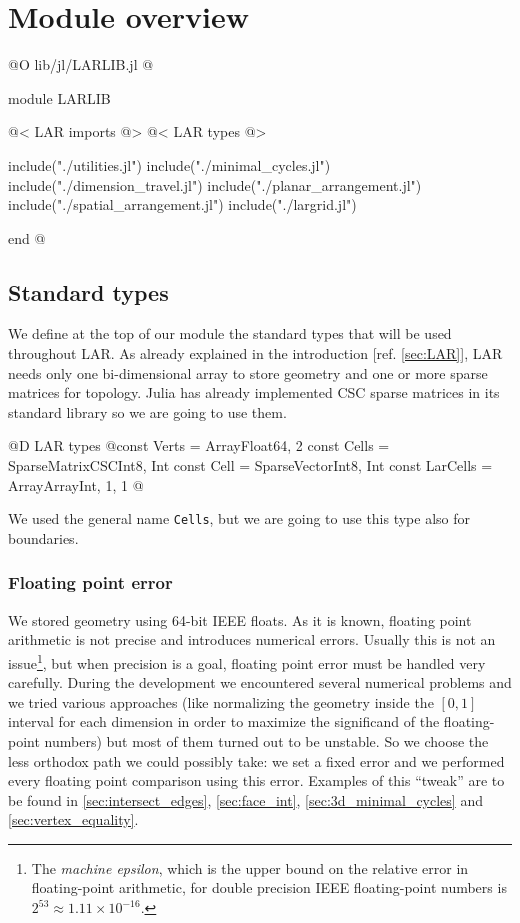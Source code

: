 \chapter{Module overview}

@O lib/jl/LARLIB.jl
@{module LARLIB

    @< LAR imports @>
    @< LAR types @>

    include("./utilities.jl")
    include("./minimal_cycles.jl")
    include("./dimension_travel.jl")
    include("./planar_arrangement.jl")
    include("./spatial_arrangement.jl")
    include("./largrid.jl")
    
end
@}

\section{Standard types}

We define at the top of our module the standard types
that will be used throughout LAR. As already explained
in the introduction [ref. \ref{sec:LAR}], LAR needs
only one bi-dimensional array to store geometry and 
one or more sparse matrices for topology.
Julia has already implemented CSC sparse matrices in
its standard library so we are going to use them.

@D LAR types
@{const Verts = Array{Float64, 2}
const Cells = SparseMatrixCSC{Int8, Int}
const Cell = SparseVector{Int8, Int}
const LarCells = Array{Array{Int, 1}, 1}
@}

We used the general name \texttt{Cells}, but
we are going to use this type also for boundaries.

\subsection{Floating point error}
\label{sec:floating-point_error}

We stored geometry using 64-bit IEEE floats.
As it is known, floating point arithmetic is not
precise and introduces numerical errors.
Usually this is not an issue\footnote{The \textit{machine epsilon},
which is the upper bound on the relative error in floating-point 
arithmetic, for double precision IEEE floating-point numbers is 
$2^53 \approx 1.11 \times 10^{-16}$.}, but when precision is
a goal, floating point error must be handled very carefully.
During the development we encountered several numerical problems
and we tried various approaches (like normalizing the geometry
inside the $[0, 1]$ interval for each dimension in order to maximize
the significand of the floating-point numbers) but most of them turned 
out to be unstable. So we choose the less orthodox path we could
possibly take: we set a fixed error and we performed every floating point
comparison using this error. Examples of this ``tweak'' are to be found in
\ref{sec:intersect_edges}, \ref{sec:face_int}, \ref{sec:3d_minimal_cycles} and 
\ref{sec:vertex_equality}.

